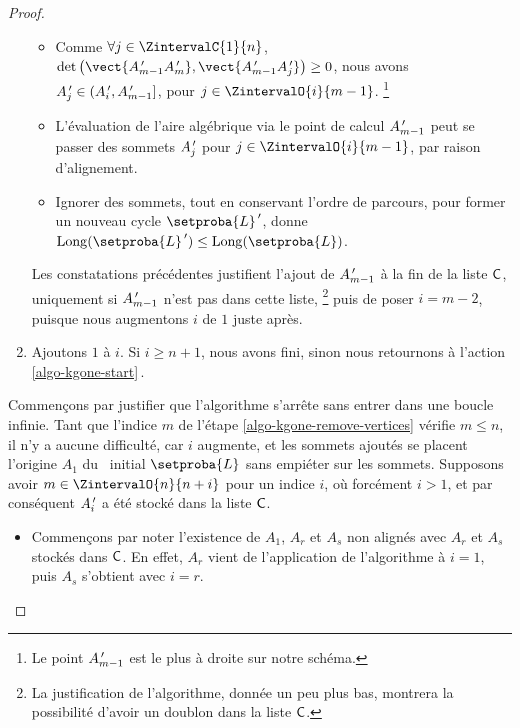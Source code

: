 \begin{proof}
\begin{enumerate}[label=\fbox{\small\bfseries\textsf{A\kern.25pt\arabic*}}]
\begin{itemize}
            \item Comme 
            $\forall j \in \ZintervalC{1}{n}$,
            $\det \big( \vect{\primeit{A}_{m-1} \primeit{A}_m}, \vect{\primeit{A}_{m-1} \primeit{A}_{j}} \big) \geq 0$, 
            nous avons
            $A^{\,\prime}_{j} \in ( A^{\,\prime}_i , A^{\,\prime}_{m-1} ]$,
            pour $j \in \ZintervalO{i}{m-1}$.%
            \footnote{
        	    Le point $A^{\,\prime}_{m-1}$ est le plus à droite sur notre schéma.
            }

            \item L'évaluation de l'aire algébrique via le point de calcul $A^{\,\prime}_{m-1}$ peut se passer des sommets $A^{\,\prime}_j$ pour $j \in \ZintervalO{i}{m-1}$, par raison d'alignement.

            \item Ignorer des sommets, tout en conservant l'ordre de parcours, pour former un nouveau cycle $\setproba{L}^{\,\prime}$, donne $\cyclelen{\setproba{L}^{\,\prime}} \leq \cyclelen{\setproba{L}} $.
        \end{itemize}
        
        \noindent
        Les constatations précédentes justifient l'ajout de
        $A^{\,\prime}_{m-1}$ à la fin de la liste $\mathsf{C}$, uniquement si $A^{\,\prime}_{m-1}$ n'est pas dans cette liste,%
        \footnote{
        	La justification de l'algorithme, donnée un peu plus bas, montrera la possibilité d'avoir un doublon dans la liste $\mathsf{C}$.
        }
        puis de poser $i = m - 2$, puisque nous augmentons $i$ de $1$ juste après.

	
		\item \label{algo-kgone-loop-back}
		Ajoutons $1$ à $i$.
		Si $i \geq n+1$, nous avons fini, sinon nous retournons à l'action \ref{algo-kgone-start}\,.
    \end{enumerate}
    

    \medskip

    
    Commençons par justifier que l'algorithme s'arrête sans entrer dans une boucle infinie.
    Tant que l'indice $m$ de l'étape \ref{algo-kgone-remove-vertices} vérifie $m \leq n$, il n'y a aucune difficulté, car $i$ augmente, et les sommets ajoutés se placent  l'origine $A_1$ du \ncycle\ initial $\setproba{L}$ sans empiéter sur les  sommets. Supposons avoir $m \in \ZintervalO{n}{n+i}$ pour un indice $i$, où forcément $i > 1$, et par conséquent $A^{\,\prime}_i$ a été stocké dans la liste $\mathsf{C}$.
    \begin{itemize}
        \item Commençons par noter l'existence de $A_1$, $A_r$ et $A_s$ non alignés avec $A_r$ et $A_s$ stockés dans $\mathsf{C}$.
        En effet,
        $A_r$ vient de l'application de l'algorithme à $i = 1$, 
        puis
        $A_s$ s'obtient avec $i = r$.



\end{itemize}
\end{proof}
